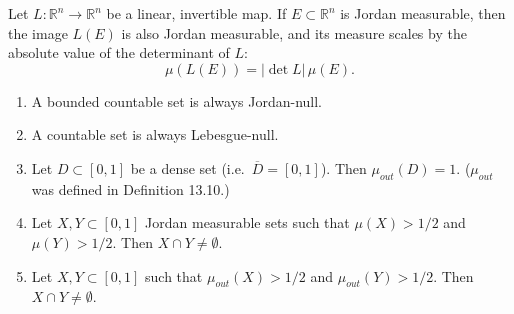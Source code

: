 \begin{theorem}
\label{thm:jordan_measure_linear_transformation}
Let $L: \mathbb{R}^n \to \mathbb{R}^n$ be a linear, invertible map. If $E \subset \mathbb{R}^n$ is Jordan measurable, then the image $L(E)$ is also Jordan measurable, and its measure scales by the absolute value of the determinant of $L$:
\[
\mu(L(E)) = |\det L| \, \mu(E).
\]
\end{theorem}




\begin{exercise}
\label{ex:jordan_measure_properties_tf}
\begin{enumerate}[label=\textbf{(\alph*)}]
  \item A bounded countable set is always Jordan-null.
  \item A countable set is always Lebesgue-null.
  \item Let $D \subset [0,1]$ be a dense set (i.e.\ $\overline D = [0,1]$). Then
    $\mu_{out}(D) = 1$. ($\mu_{out}$ was defined in Definition 13.10.)
  \item Let $X, Y \subset [0,1]$ Jordan measurable sets such that $\mu(X) > 1/2$ and
    $\mu(Y) > 1/2$. Then $X \cap Y \neq \emptyset$.
  \item Let $X, Y \subset [0,1]$ such that $\mu_{out}(X) > 1/2$ and $\mu_{out}(Y) > 1/2$. Then
    $X \cap Y \neq \emptyset$.
\end{enumerate}

\end{exercise}


